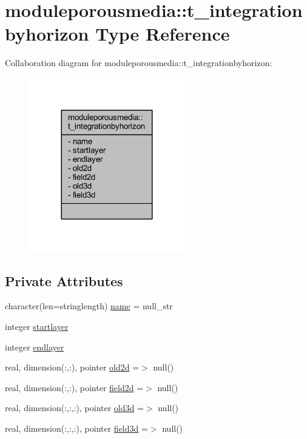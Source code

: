 \hypertarget{structmoduleporousmedia_1_1t__integrationbyhorizon}{}\section{moduleporousmedia\+:\+:t\+\_\+integrationbyhorizon Type Reference}
\label{structmoduleporousmedia_1_1t__integrationbyhorizon}


Collaboration diagram for moduleporousmedia\+:\+:t\+\_\+integrationbyhorizon\+:\nopagebreak
\begin{figure}[H]
\begin{center}
\leavevmode
\includegraphics[width=192pt]{structmoduleporousmedia_1_1t__integrationbyhorizon__coll__graph}
\end{center}
\end{figure}
\subsection*{Private Attributes}
\begin{DoxyCompactItemize}
\item 
character(len=stringlength) \mbox{\hyperlink{structmoduleporousmedia_1_1t__integrationbyhorizon_adaaddd69e42861598ac0df7e1aa7d177}{name}} = null\+\_\+str
\item 
integer \mbox{\hyperlink{structmoduleporousmedia_1_1t__integrationbyhorizon_a01084aa43501884f16613e6341305266}{startlayer}}
\item 
integer \mbox{\hyperlink{structmoduleporousmedia_1_1t__integrationbyhorizon_a050be3175d0306ca2d3955a8e5b34d64}{endlayer}}
\item 
real, dimension(\+:,\+:), pointer \mbox{\hyperlink{structmoduleporousmedia_1_1t__integrationbyhorizon_abaccb1be3a6308122d7d10ed814329e7}{old2d}} =$>$ null()
\item 
real, dimension(\+:,\+:), pointer \mbox{\hyperlink{structmoduleporousmedia_1_1t__integrationbyhorizon_af030393b629bbea4d8b21907f08a392d}{field2d}} =$>$ null()
\item 
real, dimension(\+:,\+:,\+:), pointer \mbox{\hyperlink{structmoduleporousmedia_1_1t__integrationbyhorizon_a2f957ffc07543a3e08ab014baaa83d03}{old3d}} =$>$ null()
\item 
real, dimension(\+:,\+:,\+:), pointer \mbox{\hyperlink{structmoduleporousmedia_1_1t__integrationbyhorizon_a50ad7b110033980d4b382140109a9190}{field3d}} =$>$ null()
\end{DoxyCompactItemize}


